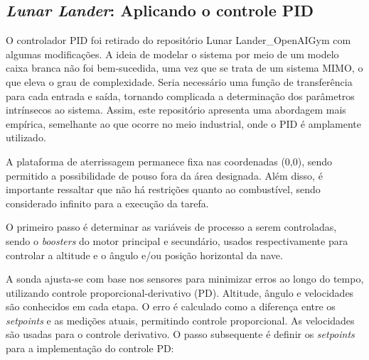 \documentclass[12pt,           %
a4paper,                       %
openany,                       %
oneside,                       %
chapter=TITLE,                 %
english,                       %
spanish,                       %
brazil,                        %
sumario=tradicional]{abntex2}  %
\begin{document}
\begin{OnehalfSpace}
\subsection{\textit{Lunar Lander}: Aplicando o controle PID}
\label{sec:pidLunarLanderEC} 

O controlador PID foi retirado do repositório Lunar Lander\_OpenAIGym \cite{llpid} com algumas modificações. A ideia de modelar o sistema por meio de um modelo caixa branca não foi bem-sucedida, uma vez que se trata de um sistema MIMO, o que eleva o grau de complexidade. Seria necessário uma função de transferência para cada entrada e saída, tornando complicada a determinação dos parâmetros intrínsecos ao sistema. Assim, este repositório apresenta uma abordagem mais empírica, semelhante ao que ocorre no meio industrial, onde o PID é amplamente utilizado.

A plataforma de aterrissagem permanece fixa nas coordenadas (0,0), sendo permitido a possibilidade de pouso fora da área designada. Além disso, é importante ressaltar que não há restrições quanto ao combustível, sendo considerado infinito para a execução da tarefa.

O primeiro passo é determinar as variáveis de processo a serem controladas, sendo o \textit{boosters} do motor principal e secundário, usados respectivamente para controlar a altitude e o ângulo e/ou posição horizontal da nave.


A sonda ajusta-se com base nos sensores para minimizar erros ao longo do tempo, utilizando controle proporcional-derivativo (PD). Altitude, ângulo e velocidades são conhecidos em cada etapa. O erro é calculado como a diferença entre os \textit{setpoints} e as medições atuais, permitindo controle proporcional. As velocidades são usadas para o controle derivativo. O passo subsequente é definir os \textit{setpoints} para a implementação do controle PD:


\end{OnehalfSpace}
\end{document}
